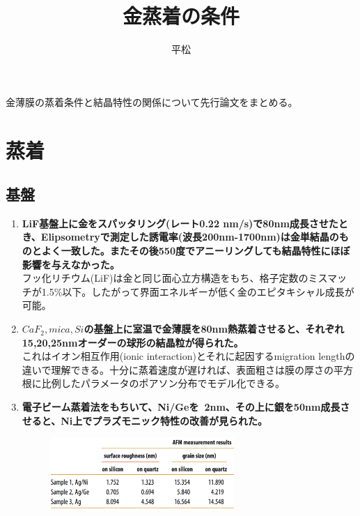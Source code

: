 \documentclass[11pt]{article}
\begin{document}
\title{金蒸着の条件}
\author{平松}
\maketitle

\abstract
金薄膜の蒸着条件と結晶特性の関係について先行論文をまとめる。

\section{蒸着}
\subsection{基盤}
\begin{enumerate}
\item {\bf LiF基盤上に金をスパッタリング(レート0.22 nm/s)で80nm成長させたとき、Elipsometryで測定した誘電率(波長200nm-1700nm)は金単結晶のものとよく一致した。またその後550度でアニーリングしても結晶特性にほぼ影響を与えなかった。}\\ フッ化リチウム(LiF)は金と同じ面心立方構造をもち、格子定数のミスマッチが1.5\%以下。したがって界面エネルギーが低く金のエピタキシャル成長が可能。
\cite{Au_on_LiF}\\

\item  {\bf $CaF_2, mica, Si$の基盤上に室温で金薄膜を80nm熱蒸着させると、それぞれ15,20,25nmオーダーの球形の結晶粒が得られた。}\\これはイオン相互作用(ionic interaction)とそれに起因するmigration lengthの違いで理解できる。十分に蒸着速度が遅ければ、表面粗さは膜の厚さの平方根に比例したパラメータのポアソン分布でモデル化できる。\cite{Au_mica_glass_etc}\\

\item  {\bf 電子ビーム蒸着法をもちいて、Ni/Geを~2nm、その上に銀を50nm成長させると、Ni上でプラズモニック特性の改善が見られた。} \cite{Ag_on_Ni_Ge}\\
\begin{figure}[H]
\centering
  \includegraphics[width=7cm]{./Ag_on_Ni_Ge}
\end{figure}


\end{enumerate}
\end{document}
